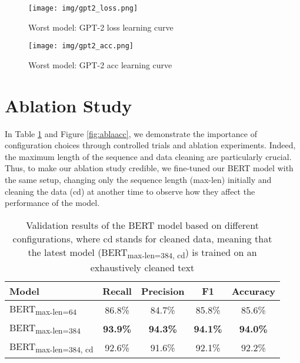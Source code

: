 \documentclass{article}
\begin{document}
\begin{figure}[ht]
  \centering
    \texttt{[image: img/gpt2\_loss.png]}
    \vspace{.7em}
    \caption{Worst model: GPT-2 loss learning curve}
    \label{fig:lossworstmodel}
\end{figure}

\begin{figure}[ht]
  \centering
    \texttt{[image: img/gpt2\_acc.png]}
        \vspace{.5em}
    \caption{Worst model: GPT-2 acc learning curve}
    \label{fig:accworstmodel}
\end{figure}

\section{Ablation Study}
 In Table \ref{tab:ablation} and Figure \ref{fig:ablaacc}, we demonstrate the importance of configuration choices through controlled trials and ablation experiments. Indeed, the maximum length of the sequence and data cleaning are particularly crucial. Thus, to make our ablation study credible, we fine-tuned our BERT model with the same setup, changing only the sequence length (max-len) initially and cleaning the data (cd) at another time to observe how they affect the performance of the model.
 
 
\begin{table}[ht]
    \centering
    \fontsize{8pt}{10pt}\selectfont
    \caption {Validation results of the BERT model based on different configurations, where cd stands for cleaned data, meaning that the latest model (BERT\textsubscript{max-len=384, cd}) is trained on an exhaustively cleaned text}
    \begin{tabular}{lcccc}
        \hline
            Model & Recall & Precision & F1 & Accuracy\\
        \hline
            BERT\textsubscript{max-len=64}       &  86.8\%     &  84.7\%     &  85.8\%     &  85.6\%   \\
            BERT\textsubscript{max-len=384}      &  \textbf{93.9\%}  &  \textbf{94.3\%}  &  \textbf{94.1\%}  &  \textbf{94.0\%} \\
            BERT\textsubscript{max-len=384, cd}  &  92.6\%     &  91.6\%     &  92.1\%     &  92.2\%   \\
        \hline
    \end{tabular}
\label{tab:ablation}
\end{table}
\end{document}

